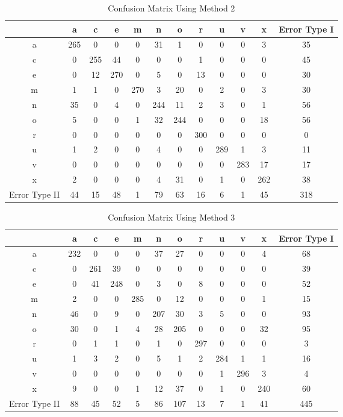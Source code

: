 \documentclass[12pt]{article}
\begin{document}
\begin{table*}
    \centering
    \caption{Confusion Matrix Using Method 2}
    \begin{tabular}{| c | c | c | c | c | c | c | c | c | c | c | c |} \hline
        & a & c & e & m & n & o & r & u & v & x & Error Type I\\ \hline
      a & 265 & 0 & 0 & 0 & 31 & 1 & 0 & 0 & 0 & 3 & 35\\ \hline
      c & 0 & 255 & 44 & 0 & 0 & 0 & 1 & 0 & 0 & 0 & 45\\ \hline
      e & 0 & 12 & 270 & 0 & 5 & 0 & 13 & 0 & 0 & 0 & 30\\ \hline
      m & 1 & 1 & 0 & 270 & 3 & 20 & 0 & 2 & 0 & 3 & 30\\ \hline
      n & 35 & 0 & 4 & 0 & 244 & 11 & 2 & 3 & 0 & 1 & 56\\ \hline
      o & 5 & 0 & 0 & 1 & 32 & 244 & 0 & 0 & 0 & 18 & 56\\ \hline
      r & 0 & 0 & 0 & 0 & 0 & 0 & 300 & 0 & 0 & 0 & 0\\ \hline
      u & 1 & 2 & 0 & 0 & 4 & 0 & 0 & 289 & 1 & 3 & 11\\ \hline
      v & 0 & 0 & 0 & 0 & 0 & 0 & 0 & 0 & 283 & 17 & 17\\ \hline
      x & 2 & 0 & 0 & 0 & 4 & 31 & 0 & 1 & 0 & 262 & 38\\ \hline
Error Type II & 44 & 15 & 48 & 1 & 79 & 63 & 16 & 6 & 1 & 45 & 318\\ \hline
    \end{tabular}
\end{table*}

\begin{table*}
    \centering
    \caption{Confusion Matrix Using Method 3}
    \begin{tabular}{| c | c | c | c | c | c | c | c | c | c | c | c |} \hline
        & a & c & e & m & n & o & r & u & v & x & Error Type I\\ \hline
      a & 232 & 0 & 0 & 0 & 37 & 27 & 0 & 0 & 0 & 4 & 68\\ \hline
      c & 0 & 261 & 39 & 0 & 0 & 0 & 0 & 0 & 0 & 0 & 39\\ \hline
      e & 0 & 41 & 248 & 0 & 3 & 0 & 8 & 0 & 0 & 0 & 52\\ \hline
      m & 2 & 0 & 0 & 285 & 0 & 12 & 0 & 0 & 0 & 1 & 15\\ \hline
      n & 46 & 0 & 9 & 0 & 207 & 30 & 3 & 5 & 0 & 0 & 93\\ \hline
      o & 30 & 0 & 1 & 4 & 28 & 205 & 0 & 0 & 0 & 32 & 95\\ \hline
      r & 0 & 1 & 1 & 0 & 1 & 0 & 297 & 0 & 0 & 0 & 3\\ \hline
      u & 1 & 3 & 2 & 0 & 5 & 1 & 2 & 284 & 1 & 1 & 16\\ \hline
      v & 0 & 0 & 0 & 0 & 0 & 0 & 0 & 1 & 296 & 3 & 4\\ \hline
      x & 9 & 0 & 0 & 1 & 12 & 37 & 0 & 1 & 0 & 240 & 60\\ \hline
Error Type II & 88 & 45 & 52 & 5 & 86 & 107 & 13 & 7 & 1 & 41 & 445\\ \hline
    \end{tabular}
\end{table*}
\end{document}

